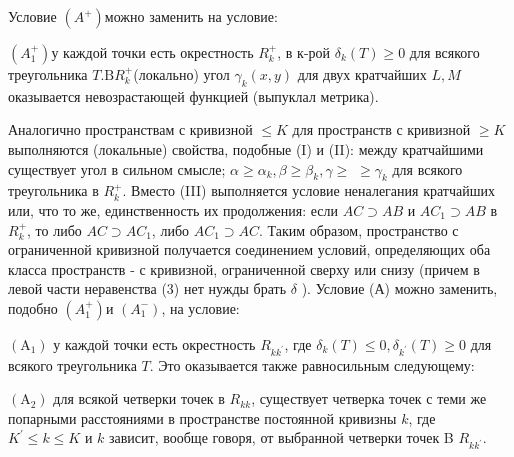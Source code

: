 \documentclass[10pt]{article}
\begin{document}
Условие $\left(A^{+}\right)$можно заменить на условие:



$\left(A_{1}^{+}\right)$у каждой точки есть окрестность $R_{k}^{+}$, в к-рой $\delta_{k}(T) \geqslant 0$ для всякого треугольника $T . \mathrm{B} R_{k}^{+}$(локально) угол $\gamma_{k}(x, y)$ для двух кратчайших $L, M$ оказывается невозрастающей функцией (выпуклал метрика).



Аналогично пространствам с кривизной $\leqslant K$ для пространств с кривизной $\geqslant K$ выполняются (локальные) свойства, подобные (I) и (II): между кратчайшими существует угол в сильном смысле; $\alpha \geqslant \alpha_{k}, \beta \geqslant \beta_{k}, \gamma \geqslant$ $\geqslant \gamma_{k}$ для всякого треугольника в $R_{k}^{+}$. Вместо (III) выполняется условие неналегания кратчайших или, что то же, единственность их продолжения: если $A C \supset A B$ и $A C_{1} \supset A B$ в $R_{k}^{+}$, то либо $A C \supset A C_{1}$, либо $A C_{1} \supset A C$. Таким образом, пространство с ограниченной кривизной получается соединением условий, определяющих оба класса пространств - с кривизной, ограниченной сверху или снизу (причем в левой части неравенства (3) нет нужды брать $\delta$ ). Условие (А) можно заменить, подобно $\left(A_{1}^{+}\right)$и $\left(A_{1}^{-}\right)$, на условие:



$\left(\mathrm{A}_{1}\right)$ у каждой точки есть окрестность $R_{k k^{\prime}}$, где $\delta_{k}(T) \leqslant 0, \delta_{k^{\prime}}(T) \geqslant 0$ для всякого треугольника $T$. Это оказывается также равносильным следующему:



$\left(\mathrm{A}_{2}\right)$ для всякой четверки точек в $R_{k k}$, существует четверка точек с теми же попарными расстояниями в пространстве постоянной кривизны $k$, где $K^{\prime} \leqslant k \leqslant K$ и $k$ зависит, вообще говоря, от выбранной четверки точек B $R_{k k^{\prime}}$.
\end{document}
